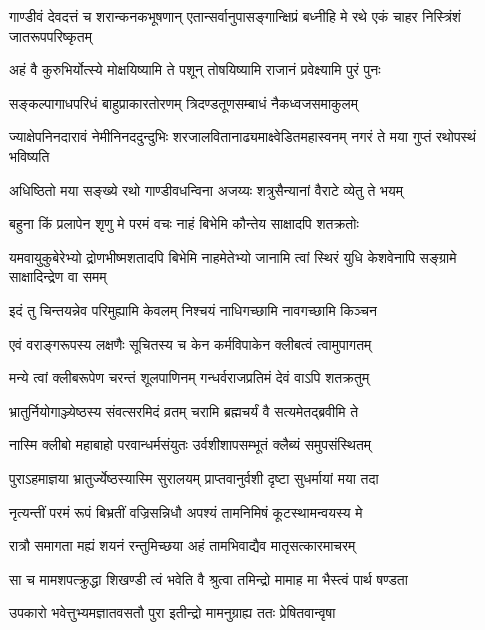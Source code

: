 \threelineshloka
{गाण्डीवं देवदत्तं च शरान्कनकभूषणान्}
{एतान्सर्वानुपासङ्गान्क्षिप्रं बध्नीहि मे रथे}
{एकं चाहर निस्त्रिंशं जातरूपपरिष्कृतम्}


\twolineshloka
{अहं वै कुरुभिर्योत्स्ये मोक्षयिष्यामि ते पशून्}
{तोषयिष्यामि राजानं प्रवेक्ष्यामि पुरं पुनः}


\twolineshloka
{सङ्कल्पागाधपरिधं बाहुप्राकारतोरणम्}
{त्रिदण्डतूणसम्बाधं नैकध्वजसमाकुलम्}


\threelineshloka
{ज्याक्षेपनिनदारावं नेमीनिनददुन्दुभिः}
{शरजालवितानाढ्यमाक्ष्वेडितमहास्वनम्}
{नगरं ते मया गुप्तं रथोपस्थं भविष्यति}


\twolineshloka
{अधिष्ठितो मया सङ्ख्ये रथो गाण्डीवधन्विना}
{अजय्यः शत्रुसैन्यानां वैराटे व्येतु ते भयम्}




\twolineshloka
{बहुना किं प्रलापेन शृणु मे परमं वचः}
{नाहं बिभेमि कौन्तेय साक्षादपि शतक्रतोः}


\threelineshloka
{यमवायुकुबेरेभ्यो द्रोणभीष्मशतादपि}
{बिभेमि नाहमेतेभ्यो जानामि त्वां स्थिरं युधि}
{केशवेनापि सङ्ग्रामे साक्षादिन्द्रेण वा समम्}


\twolineshloka
{इदं तु चिन्तयन्नेव परिमुह्यामि केवलम्}
{निश्चयं नाधिगच्छामि नावगच्छामि किञ्चन}


\twolineshloka
{एवं वराङ्गरूपस्य लक्षणैः सूचितस्य च}
{केन कर्मविपाकेन क्लीबत्वं त्वामुपागतम्}


\twolineshloka
{मन्ये त्वां क्लीबरूपेण चरन्तं शूलपाणिनम्}
{गन्धर्वराजप्रतिमं देवं वाऽपि शतक्रतुम्}




\twolineshloka
{भ्रातुर्नियोगाञ्ज्येष्ठस्य संवत्सरमिदं व्रतम्}
{चरामि ब्रह्मचर्यं वै सत्यमेतद्ब्रवीमि ते}


\twolineshloka
{नास्मि क्लीबो महाबाहो परवान्धर्मसंयुतः}
{उर्वशीशापसम्भूतं क्लैब्यं समुपसंस्थितम्}


\twolineshloka
{पुराऽहमाज्ञया भ्रातुर्ज्येष्ठस्यास्मि सुरालयम्}
{प्राप्तवानुर्वशी दृष्टा सुधर्मायां मया तदा}


\twolineshloka
{नृत्यन्तीं परमं रूपं बिभ्रतीं वज्रिसन्निधौ}
{अपश्यं तामनिमिषं कूटस्थामन्वयस्य मे}


\twolineshloka
{रात्रौ समागता मह्यं शयनं रन्तुमिच्छया}
{अहं तामभिवाद्यैव मातृसत्कारमाचरम्}


\twolineshloka
{सा च मामशपत्क्रुद्धा शिखण्डी त्वं भवेति वै}
{श्रुत्वा तमिन्द्रो मामाह मा भैस्त्वं पार्थ षण्डता}


\twolineshloka
{उपकारो भवेत्तुभ्यमज्ञातवसतौ पुरा}
{इतीन्द्रो मामनुग्राह्य ततः प्रेषितवान्वृषा}


